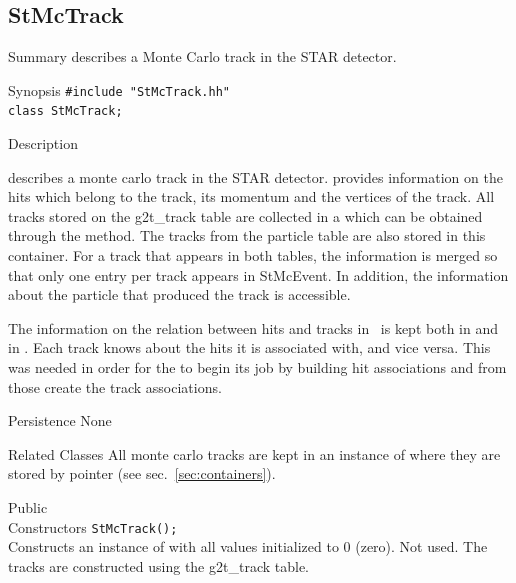 \subsection{StMcTrack}
\label{sec:StMcTrack}
\begin{Entry}
\item[Summary]
     describes a Monte Carlo track in the STAR detector.

\item[Synopsis]
    \verb+#include "StMcTrack.hh"+\\
    \verb+class StMcTrack;+\\

\item[Description]
    
     describes a monte carlo track in the STAR
    detector.  
     provides information on the
    hits which belong to the track, its momentum and the
    vertices of the track.  All
    tracks stored on the g2t\_track table are collected in a
     which can be obtained through the
     method.  The tracks from the particle
    table are also stored in this container.  For a track that appears
    in both tables, the information is merged so that only one entry
    per track appears in StMcEvent.
    In addition, the information about the particle that produced
    the track is accessible.
    
    The information on the relation between hits and tracks in
    \StMcEvent\ is kept both in  and in .
    Each track knows about the hits it is associated with, and vice versa.
    This was needed in order for the \StAssociationMaker to begin its job by
    building hit associations and from those create the track associations.
    
\item[Persistence]
    None

\item[Related Classes]
    All monte carlo tracks are kept in an instance of 
    where they are stored by pointer (see sec.~\ref{sec:containers}).

\item[Public\\ Constructors]
    \verb+StMcTrack();+\\
    Constructs an instance of  with all values initialized to 0 (zero).
    Not used.  The tracks are constructed using the g2t\_track table.


\end{Entry}
